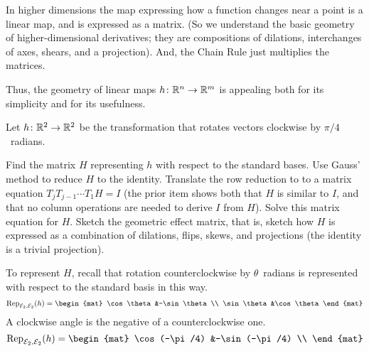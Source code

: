 In higher dimensions 
the map expressing how a function changes near a point is a linear map,
and is expressed as a matrix.
(So we understand the basic geometry of higher-dimensional derivatives;
they are compositions of dilations, interchanges of axes, shears, and 
a projection).
And, the Chain Rule just multiplies the matrices.

Thus, the geometry of linear maps $\mbox{$h\colon \mathbb{R}^n\to \mathbb{R}^m$}$ 
is appealing both for its simplicity and for its usefulness.

\begin{exercises}
  \item 
    Let $\mbox{$h\colon \mathbb{R}^2\to \mathbb{R}^2$}$ be the transformation that rotates
    vectors clockwise by $\pi/4$~radians.
    \begin{exparts}
      \partsitem Find the matrix $H$ representing 
         $h$ with respect to the standard bases.
         Use Gauss' method to reduce $H$ to the identity.
      \partsitem Translate the row reduction to to a matrix equation
        $T_jT_{j-1}\cdots T_1H=I$
        (the prior item shows both that $H$ is similar to $I$, and that
        no column operations are needed to derive $I$ from $H$).
      \partsitem Solve this matrix equation for $H$.
      \partsitem Sketch the geometric effect matrix, that is, sketch how
        $H$ is expressed as a 
        combination of dilations, flips, skews, and projections
        (the identity is a trivial projection). 
    \end{exparts}
    \begin{answer}
      \begin{exparts}
        \partsitem  To represent $H$, recall that rotation counterclockwise by 
          $\theta$~radians is represented with respect to the standard basis
          in this way.
          \begin{equation*}
            \rep{h}{\stdbasis_2,\stdbasis_2}
            =\begin{mat}
              \cos\theta  &-\sin\theta  \\
              \sin\theta  &\cos\theta
             \end{mat}
          \end{equation*}
          A clockwise angle is the negative of a counterclockwise
          one.  
          \begin{equation*}
            \rep{h}{\stdbasis_2,\stdbasis_2}
            =\begin{mat}
              \cos(-\pi/4)  &-\sin(-\pi/4)  \\

\end{mat}
\end{equation*}
\end{exparts}
\end{answer}
\end{exercises}
